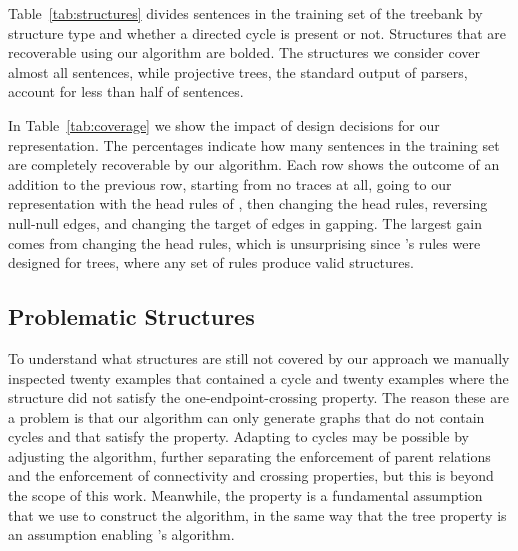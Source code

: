 Table~\ref{tab:structures} divides sentences in the training set of the treebank by structure type and whether a directed cycle is present or not.
Structures that are recoverable using our algorithm are bolded.
The structures we consider cover almost all sentences, while projective trees, the standard output of parsers, account for less than half of sentences.

In Table~\ref{tab:coverage} we show the impact of design decisions for our representation.
The percentages indicate how many sentences in the training set are completely recoverable by our algorithm.
Each row shows the outcome of an addition to the previous row, starting from no traces at all, going to our representation with the head rules of \textcite{cck}, then changing the head rules, reversing null-null edges, and changing the target of edges in gapping.
The largest gain comes from changing the head rules, which is unsurprising since \textcite{cck}'s rules were designed for trees, where any set of rules produce valid structures.

\subsection{Problematic Structures}

To understand what structures are still not covered by our approach we manually inspected twenty examples that contained a cycle and twenty examples where the structure did not satisfy the one-endpoint-crossing property.
The reason these are a problem is that our algorithm can only generate graphs that do not contain cycles and that satisfy the \oneEC property.
Adapting to cycles may be possible by adjusting the algorithm, further separating the enforcement of parent relations and the enforcement of connectivity and crossing properties, but this is beyond the scope of this work.
Meanwhile, the \oneEC property is a fundamental assumption that we use to construct the algorithm, in the same way that the tree property is an assumption enabling \textcite{eisner:1996}'s algorithm.

